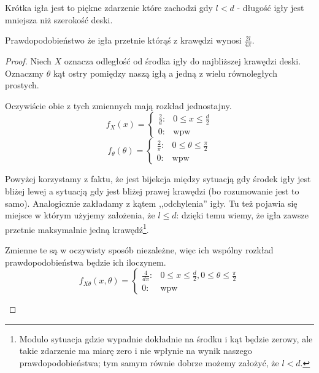 \begin{definition}
	Krótka igła jest to piękne zdarzenie które zachodzi gdy \(l < d\) - długość igły jest mniejsza niż szerokość deski.
\end{definition}

\begin{theorem}
	Prawdopodobieństwo że igła przetnie którąś z krawędzi wynosi \(\frac{2l}{4\pi}\).
\end{theorem}
\begin{proof}
	Niech \(X\) oznacza odległość od środka igły do najbliższej krawędzi deski. Oznaczmy \(\theta\) kąt ostry pomiędzy naszą igłą a jedną z wielu równoległych prostych.

	Oczywiście obie z tych zmiennych mają rozkład jednostajny.
	\[
		f_X(x) =
		\begin{cases}
			\frac{2}{d}: & 0 \leq x \leq \frac{d}{2} \\
			0:           & \text{wpw}
		\end{cases}
	\]
	\[
		f_\theta(\theta) =
		\begin{cases}
			\frac{2}{\pi}: & 0 \leq \theta \leq \frac{\pi}{2} \\
			0:             & \text{wpw}
		\end{cases}
	\]

	Powyżej korzystamy z faktu, że jest bijekcja między sytuacją gdy środek igły jest bliżej lewej a sytuacją gdy jest bliżej prawej krawędzi (bo rozumowanie jest to samo). Analogicznie zakładamy z kątem ,,odchylenia'' igły. Tu też pojawia się miejsce w którym użyjemy założenia, że \( l \leq d\): dzięki temu wiemy, że igła zawsze przetnie maksymalnie jedną krawędź\footnote{Modulo sytuacja gdzie wypadnie dokładnie na środku i kąt będzie zerowy, ale takie zdarzenie ma miarę zero i nie wpłynie na wynik naszego prawdopodobieństwa; tym samym równie dobrze możemy założyć, że \(l < d\).}.

	Zmienne te są w oczywisty sposób niezależne, więc ich wspólny rozkład prawdopodobieństwa będzie ich iloczynem.
	\[
		f_{X\theta}(x, \theta) =
		\begin{cases}
			\frac{4}{d\pi}: & 0 \leq x \leq \frac{d}{2}, 0 \leq \theta \leq \frac{\pi}{2} \\
			0:              & \text{wpw}
		\end{cases}
	\]


	\begin{center}

		\begin{tikzpicture}[scale=1]


\end{tikzpicture}
\end{center}
\end{proof}
